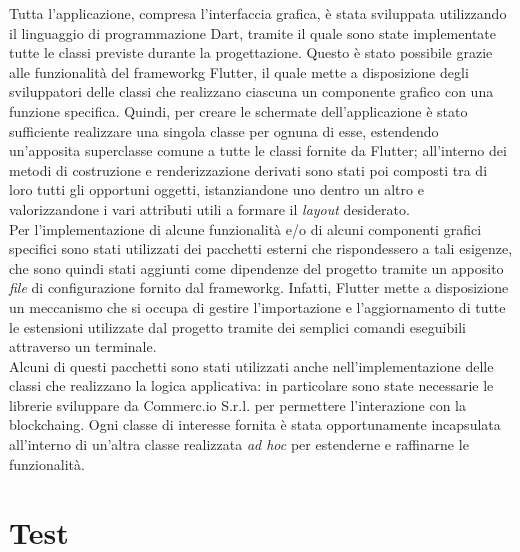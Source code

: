 Tutta l'applicazione, compresa l'interfaccia grafica, è stata sviluppata utilizzando il linguaggio di programmazione Dart, tramite il quale sono state implementate tutte le classi previste durante la progettazione. Questo è stato possibile grazie alle funzionalità del \gls{frameworkg} Flutter, il quale mette a disposizione degli sviluppatori delle classi che realizzano ciascuna un componente grafico con una funzione specifica. Quindi, per creare le schermate dell'applicazione è stato sufficiente realizzare una singola classe per ognuna di esse, estendendo un'apposita superclasse comune a tutte le classi fornite da Flutter; all'interno dei metodi di costruzione e renderizzazione derivati sono stati poi composti tra di loro tutti gli opportuni oggetti, istanziandone uno dentro un altro e valorizzandone i vari attributi utili a formare il \textit{layout} desiderato.\\
Per l'implementazione di alcune funzionalità e/o di alcuni componenti grafici specifici sono stati utilizzati dei pacchetti esterni che rispondessero a tali esigenze, che sono quindi stati aggiunti come dipendenze del progetto tramite un apposito \textit{file} di configurazione fornito dal \gls{frameworkg}. Infatti, Flutter mette a disposizione un meccanismo che si occupa di gestire l'importazione e l'aggiornamento di tutte le estensioni utilizzate dal progetto tramite dei semplici comandi eseguibili attraverso un terminale.\\ 
Alcuni di questi pacchetti sono stati utilizzati anche nell'implementazione delle classi che realizzano la logica applicativa: in particolare sono state necessarie le librerie sviluppare da Commerc.io S.r.l. per permettere l'interazione con la \gls{blockchaing}. Ogni classe di interesse fornita è stata opportunamente incapsulata all'interno di un'altra classe realizzata \textit{ad hoc} per estenderne e raffinarne le funzionalità.

\section{Test}

